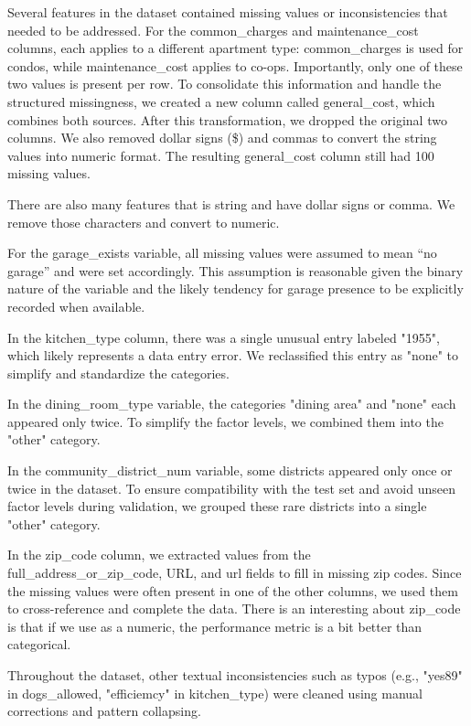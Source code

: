 \documentclass[12pt]{article}
\begin{document}
Several features in the dataset contained missing values or inconsistencies that needed to be addressed. For the common\_charges and maintenance\_cost columns, each applies to a different apartment type: common\_charges is used for condos, while maintenance\_cost applies to co-ops. Importantly, only one of these two values is present per row. To consolidate this information and handle the structured missingness, we created a new column called general\_cost, which combines both sources. After this transformation, we dropped the original two columns. We also removed dollar signs (\$) and commas to convert the string values into numeric format. The resulting general\_cost column still had 100 missing values. 

There are also many features that is string and have dollar signs or comma. We remove those characters and convert to numeric. 

For the garage\_exists variable, all missing values were assumed to mean “no garage” and were set accordingly. This assumption is reasonable given the binary nature of the variable and the likely tendency for garage presence to be explicitly recorded when available.

In the kitchen\_type column, there was a single unusual entry labeled "1955", which likely represents a data entry error. We reclassified this entry as "none" to simplify and standardize the categories.

In the dining\_room\_type variable, the categories "dining area" and "none" each appeared only twice. To simplify the factor levels, we combined them into the "other" category.

In the community\_district\_num variable, some districts appeared only once or twice in the dataset. To ensure compatibility with the test set and avoid unseen factor levels during validation, we grouped these rare districts into a single "other" category.

In the zip\_code column, we extracted values from the full\_address\_or\_zip\_code, URL, and url fields to fill in missing zip codes. Since the missing values were often present in one of the other columns, we used them to cross-reference and complete the data. There is an interesting about zip\_code is that if we use as a numeric, the performance metric is a bit better than categorical. 


Throughout the dataset, other textual inconsistencies such as typos (e.g., "yes89" in dogs\_allowed, "efficiemcy" in kitchen\_type) were cleaned using manual corrections and pattern collapsing. 
\end{document}
